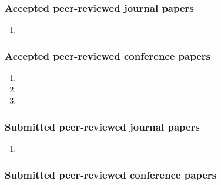 \subsubsection{Accepted peer-reviewed journal papers}
\begin{enumerate}
	\item {}
\end{enumerate}

\subsubsection{Accepted peer-reviewed conference papers}
\begin{enumerate}
	\item {}
	\item {}
	\item {}
\end{enumerate}

\subsubsection{Submitted peer-reviewed journal papers}
\begin{enumerate}
	\item {}
\end{enumerate}


\subsubsection{Submitted peer-reviewed conference papers}
